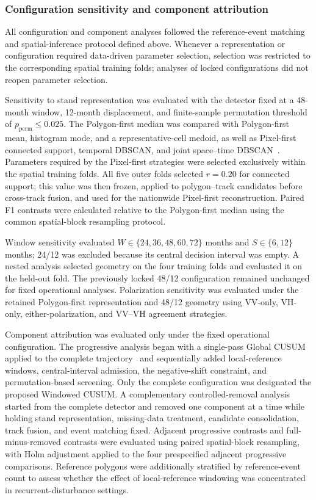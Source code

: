 \subsubsection{Configuration sensitivity and component attribution}
\label{sec:configuration_component}

All configuration and component analyses followed the reference-event matching and spatial-inference protocol defined above. Whenever a representation or configuration required data-driven parameter selection, selection was restricted to the corresponding spatial training folds; analyses of locked configurations did not reopen parameter selection.

Sensitivity to stand representation was evaluated with the detector fixed at a 48-month window, 12-month displacement, and finite-sample permutation threshold of $p_{\mathrm{perm}}\leq0.025$. The Polygon-first median was compared with Polygon-first mean, histogram mode, and a representative-cell medoid, as well as Pixel-first connected support, temporal DBSCAN, and joint space--time DBSCAN~\citep{Ester1996DBSCAN}. Parameters required by the Pixel-first strategies were selected exclusively within the spatial training folds. All five outer folds selected $r=0.20$ for connected support; this value was then frozen, applied to polygon--track candidates before cross-track fusion, and used for the nationwide Pixel-first reconstruction. Paired F1 contrasts were calculated relative to the Polygon-first median using the common spatial-block resampling protocol.

Window sensitivity evaluated $W\in\{24,36,48,60,72\}$ months and $S\in\{6,12\}$ months; 24/12 was excluded because its central decision interval was empty. A nested analysis selected geometry on the four training folds and evaluated it on the held-out fold. The previously locked 48/12 configuration remained unchanged for fixed operational analyses. Polarization sensitivity was evaluated under the retained Polygon-first representation and 48/12 geometry using VV-only, VH-only, either-polarization, and VV--VH agreement strategies.


Component attribution was evaluated only under the fixed operational configuration. The progressive analysis began with a single-pass Global CUSUM applied to the complete trajectory~\citep{Page1954CUSUM} and sequentially added local-reference windows, central-interval admission, the negative-shift constraint, and permutation-based screening. Only the complete configuration was designated the proposed Windowed CUSUM. A complementary controlled-removal analysis started from the complete detector and removed one component at a time while holding stand representation, missing-data treatment, candidate consolidation, track fusion, and event matching fixed. Adjacent progressive contrasts and full-minus-removed contrasts were evaluated using paired spatial-block resampling, with Holm adjustment applied to the four prespecified adjacent progressive comparisons. Reference polygons were additionally stratified by reference-event count to assess whether the effect of local-reference windowing was concentrated in recurrent-disturbance settings.


